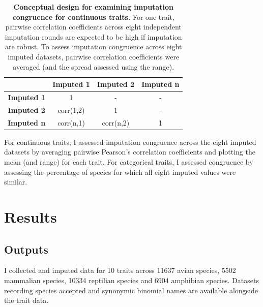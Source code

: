 \begin{table}[h!]
\renewcommand{\baselinestretch}{1}
\renewcommand{\arraystretch}{1.5}
\begin{center}\fontsize{9}{11}\selectfont
\caption[Conceptual design for examining imputation congruence for continuous traits]{\textbf{Conceptual design for examining imputation congruence for continuous traits.} For one trait, pairwise correlation coefficients across eight independent imputation rounds are expected to be high if imputation are robust. To assess imputation congruence across eight imputed datasets, pairwise correlation coefficients were averaged (and the spread assessed using the range).} 
\label{pairwisecorr}
 \begin{tabular}{c|c|c|c|}
\cline{2-4}
\multicolumn{1}{l|}{}                    & \textbf{Imputed 1} & \textbf{Imputed 2} & \textbf{Imputed n} \\ \hline
\multicolumn{1}{|c|}{\textbf{Imputed 1}} & 1                  & -                  & -                  \\ \hline
\multicolumn{1}{|c|}{\textbf{Imputed 2}} & corr(1,2)          & 1                  & -                  \\ \hline
\multicolumn{1}{|c|}{\textbf{Imputed n}} & corr(n,1)          & corr(n,2)          & 1                  \\ \hline
\end{tabular}
\end{center}
\end{table}


For continuous traits, I assessed imputation congruence across the eight imputed datasets by averaging pairwise Pearson's correlation coefficients and plotting the mean (and range) for each trait. For categorical traits, I assessed congruence by assessing the percentage of species for which all eight imputed values were similar.




\section{Results}

\subsection{Outputs}
I collected and imputed data for 10 traits across 11637 avian species, 5502 mammalian species, 10334 reptilian species and 6904 amphibian species. Datasets recording species accepted and synonymic binomial names are available alongside the trait data. 

